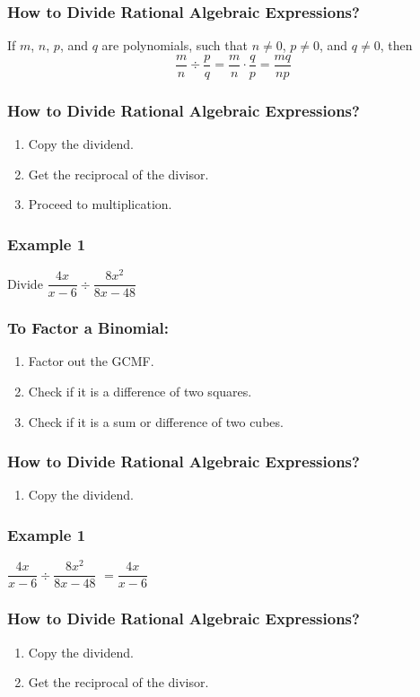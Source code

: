 \documentclass[14pt]{beamer}
\begin{document}
    \begin{frame}
    	\frametitle{How to Divide Rational Algebraic Expressions?}
    	If $ m $, $ n $, $ p $, and $ q $ are polynomials, such that $ n \neq 0 $, $ p \neq 0 $, and $ q \neq 0 $, then \[ \dfrac{m}{n} \div \dfrac{p}{q} = \dfrac{m}{n} \cdot \dfrac{q}{p} = \dfrac{mq}{np} \]
    \end{frame}
    
    \begin{frame}
    	\frametitle{How to Divide Rational Algebraic Expressions?}
    	\begin{enumerate}
    		\item<1-> Copy the dividend.
    		\item<2-> Get the reciprocal of the divisor.
    		\item<3-> Proceed to multiplication.
    	\end{enumerate}
    \end{frame}

    \begin{frame}
    	\frametitle{Example 1}
    	Divide $\dfrac{4x}{x - 6} \div \dfrac{8x^2}{8x - 48}$ 
    \end{frame}

    \begin{frame}
    	\frametitle{To Factor a Binomial:}
    	\begin{enumerate}
    		\item<1-> Factor out the GCMF.
    		\item<2-> Check if it is a difference of two squares.
    		\item<3-> Check if it is a sum or difference of two cubes.
    	\end{enumerate}
    \end{frame}

    \begin{frame}
    	\frametitle{How to Divide Rational Algebraic Expressions?}
    	\begin{enumerate}
    		\item Copy the dividend.
    	\end{enumerate}
    \end{frame}

    \begin{frame}
    	\frametitle{Example 1}
    	$\dfrac{4x}{x - 6} \div \dfrac{8x^2}{8x - 48} $	\pause  $ = \dfrac{4x}{x - 6} $ 
    \end{frame}

    \begin{frame}
    	\frametitle{How to Divide Rational Algebraic Expressions?}
    	\begin{enumerate}
    		\item Copy the dividend.
    		\item Get the reciprocal of the divisor.
    	\end{enumerate}
    \end{frame}
\end{document}
